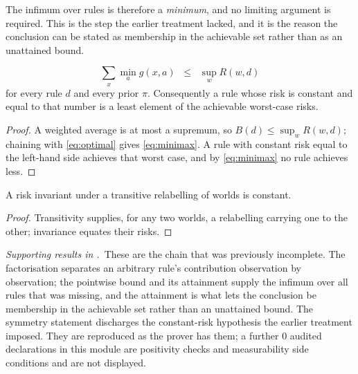 
The infimum over rules is therefore a \emph{minimum}, and no limiting argument is required.
This is the step the earlier treatment lacked, and it is the reason the conclusion can be
stated as membership in the achievable set rather than as an unattained bound.

\begin{theorem}
\label{thm:minimax}
\begin{equation}
\sum_{x}\min_{a}g(x,a)\;\;\leq\;\;\sup_{w}R(w,d)
\label{eq:minimax}
\end{equation}
for every rule $d$ and every prior $\pi$. Consequently a rule whose risk is constant and equal
to that number is a least element of the achievable worst-case risks.
\end{theorem}

\begin{proof}
A weighted average is at most a supremum, so $B(d)\le\sup_{w}R(w,d)$; chaining with
\eqref{eq:optimal} gives \eqref{eq:minimax}. A rule with constant risk equal to the left-hand
side achieves that worst case, and by \eqref{eq:minimax} no rule achieves less.
\end{proof}


\begin{proposition}
\label{prop:symmetry}
A risk invariant under a transitive relabelling of worlds is constant.
\end{proposition}

\begin{proof}
Transitivity supplies, for any two worlds, a relabelling carrying one to the other;
invariance equates their risks.
\end{proof}


\noindent\emph{Supporting results in .}~These are the chain that was previously incomplete. The factorisation separates an arbitrary rule's contribution observation by observation; the pointwise bound and its attainment supply the infimum over all rules that was missing, and the attainment is what lets the conclusion be membership in the achievable set rather than an unattained bound. The symmetry statement discharges the constant-risk hypothesis the earlier treatment imposed. They are reproduced as the prover has them; a further $0$ audited declarations in this module are positivity checks and measurability side conditions and are not displayed.

